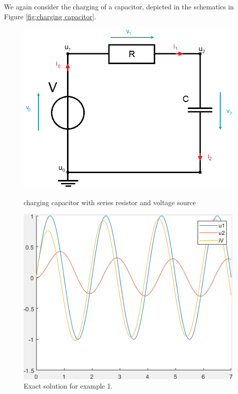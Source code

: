 	
\begin{example1}
	We again consider the charging of a capacitor, depicted in the schematics in Figure \ref{fig:charging capacitor}.
	
	\begin{figure}[H]
		\centering
		\begin{minipage}{.5\textwidth}
			\centering
			\includegraphics[width=\linewidth]{pictures/Example1_simple_p2.png}
			\caption{charging capacitor with series resistor and voltage source}
			\label{fig:charging capacitor}
		\end{minipage}%
		\begin{minipage}{.5\textwidth}
			\centering
			\includegraphics[width=\linewidth]{pictures/exact_solution_ex1.png}
			\caption{Exact solution for example 1.}
			\label{fig: Exact solution for example 1}
		\end{minipage}
	\end{figure}
	

\end{example1}
